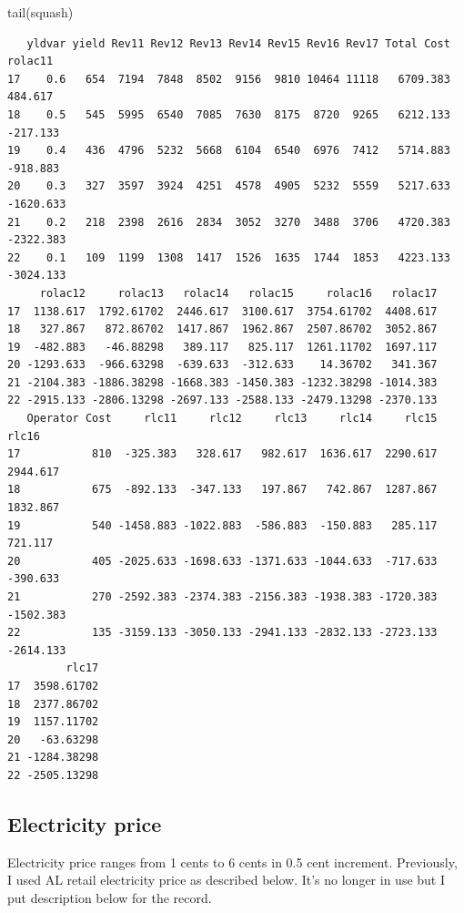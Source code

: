\documentclass[
  letterpaper,
  DIV=11,
  numbers=noendperiod]{scrartcl}
\newenvironment{Shaded}{\begin{snugshade}}{\end{snugshade}}
\newcommand{\FunctionTok}[1]{\textcolor[rgb]{0.28,0.35,0.67}{#1}}
\newcommand{\NormalTok}[1]{\textcolor[rgb]{0.00,0.23,0.31}{#1}}
\begin{document}
\begin{Shaded}
\begin{Highlighting}[]
\FunctionTok{tail}\NormalTok{(squash)}
\end{Highlighting}
\end{Shaded}

\begin{verbatim}
   yldvar yield Rev11 Rev12 Rev13 Rev14 Rev15 Rev16 Rev17 Total Cost   rolac11
17    0.6   654  7194  7848  8502  9156  9810 10464 11118   6709.383   484.617
18    0.5   545  5995  6540  7085  7630  8175  8720  9265   6212.133  -217.133
19    0.4   436  4796  5232  5668  6104  6540  6976  7412   5714.883  -918.883
20    0.3   327  3597  3924  4251  4578  4905  5232  5559   5217.633 -1620.633
21    0.2   218  2398  2616  2834  3052  3270  3488  3706   4720.383 -2322.383
22    0.1   109  1199  1308  1417  1526  1635  1744  1853   4223.133 -3024.133
     rolac12     rolac13   rolac14   rolac15     rolac16   rolac17
17  1138.617  1792.61702  2446.617  3100.617  3754.61702  4408.617
18   327.867   872.86702  1417.867  1962.867  2507.86702  3052.867
19  -482.883   -46.88298   389.117   825.117  1261.11702  1697.117
20 -1293.633  -966.63298  -639.633  -312.633    14.36702   341.367
21 -2104.383 -1886.38298 -1668.383 -1450.383 -1232.38298 -1014.383
22 -2915.133 -2806.13298 -2697.133 -2588.133 -2479.13298 -2370.133
   Operator Cost     rlc11     rlc12     rlc13     rlc14     rlc15     rlc16
17           810  -325.383   328.617   982.617  1636.617  2290.617  2944.617
18           675  -892.133  -347.133   197.867   742.867  1287.867  1832.867
19           540 -1458.883 -1022.883  -586.883  -150.883   285.117   721.117
20           405 -2025.633 -1698.633 -1371.633 -1044.633  -717.633  -390.633
21           270 -2592.383 -2374.383 -2156.383 -1938.383 -1720.383 -1502.383
22           135 -3159.133 -3050.133 -2941.133 -2832.133 -2723.133 -2614.133
         rlc17
17  3598.61702
18  2377.86702
19  1157.11702
20   -63.63298
21 -1284.38298
22 -2505.13298
\end{verbatim}

\subsection{Electricity price}\label{electricity-price}

Electricity price ranges from 1 cents to 6 cents in 0.5 cent increment.
Previously, I used AL retail electricity price as described below. It's
no longer in use but I put description below for the record.
\end{document}
